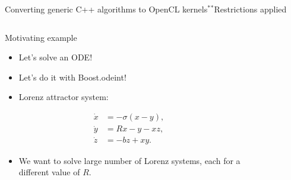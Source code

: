 \documentclass[@BEAMER_OPTIONS@]{beamer}
\begin{document}
\begin{frame}[fragile]{Converting generic C++ algorithms to OpenCL
    kernels$^*$}{$^*$Restrictions applied}
    \begin{columns}
        \begin{column}{0.6\textwidth}
            \begin{block}{Motivating example}
                \begin{itemize}
                    \item Let's solve an ODE!
                    \item Let's do it with Boost.odeint!
                        \vspace{\baselineskip}
                    \item Lorenz attractor system:
                \end{itemize}
                \vspace{-1\baselineskip}
                \begin{align*}
                    \dot{x} &= -\sigma \left( x - y \right), \\
                    \dot{y} &= R x - y - xz, \\
                    \dot{z} &= -bz + xy.
                    \label{eq:lorenz}
                \end{align*}
                \begin{itemize}
                    \item We want to solve large number of Lorenz systems, each
                        for a different value of $R$.
                \end{itemize}
            \end{block}
        \end{column}
        \begin{column}{0.4\textwidth}
            \begin{figure}

\end{figure}
\end{column}
\end{columns}
\end{frame}
\end{document}
